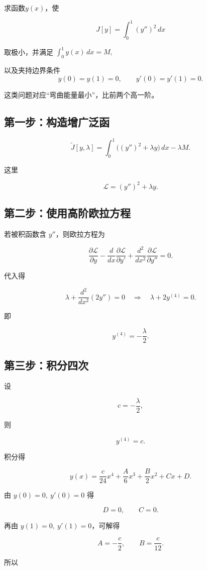 求函数\(y(x)\)，使

\[
J[y]=\int_0^1 (y'')^2\,dx
\]

取极小，并满足 \(\int_0^1 y(x)\,dx=M,\)

以及夹持边界条件\[
y(0)=y(1)=0,\qquad y'(0)=y'(1)=0.
\]

这类问题对应“弯曲能量最小”，比前两个高一阶。

\subsection{第一步：构造增广泛函}

\[
\tilde J[y,\lambda]
=
\int_0^1 \Big((y'')^2+\lambda y\Big)\,dx-\lambda M.
\]

这里

\[
\mathcal L=(y'')^2+\lambda y.
\]

\subsection{第二步：使用高阶欧拉方程}

若被积函数含 \(y''\)，则欧拉方程为

\[
\frac{\partial \mathcal L}{\partial y}
-
\frac{d}{dx}\frac{\partial \mathcal L}{\partial y'}
+
\frac{d^2}{dx^2}\frac{\partial \mathcal L}{\partial y''}
=0.
\]

代入得

\[
\lambda+ \frac{d^2}{dx^2}(2y'')=0
\quad\Longrightarrow\quad
\lambda+2y^{(4)}=0.
\]

即

\[
y^{(4)}=-\frac{\lambda}{2}.
\]

\subsection{第三步：积分四次}

设

\[
c=-\frac{\lambda}{2},
\]

则

\[
y^{(4)}=c.
\]

积分得

\[
y(x)=\frac{c}{24}x^4+\frac{A}{6}x^3+\frac{B}{2}x^2+Cx+D.
\]

由 \(y(0)=0,\ y'(0)=0\) 得

\[
D=0,\qquad C=0.
\]

再由 \(y(1)=0,\ y'(1)=0\)，可解得

\[
A=-\frac{c}{2},\qquad B=\frac{c}{12}.
\]

所以

